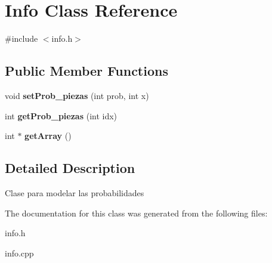 \hypertarget{classInfo}{\section{Info Class Reference}
\label{classInfo}
}


{\ttfamily \#include $<$info.\-h$>$}

\subsection*{Public Member Functions}
\begin{DoxyCompactItemize}
\item 
\hypertarget{classInfo_ad2a426dac2faca7998c6bcd2074baead}{void {\bfseries set\-Prob\-\_\-piezas} (int prob, int x)}\label{classInfo_ad2a426dac2faca7998c6bcd2074baead}

\item 
\hypertarget{classInfo_aa1536bee11bb5d2f9d76e2d44f26c6f5}{int {\bfseries get\-Prob\-\_\-piezas} (int idx)}\label{classInfo_aa1536bee11bb5d2f9d76e2d44f26c6f5}

\item 
\hypertarget{classInfo_a673f62e1f79094f22bf7ef0656ba38f3}{int $\ast$ {\bfseries get\-Array} ()}\label{classInfo_a673f62e1f79094f22bf7ef0656ba38f3}

\end{DoxyCompactItemize}


\subsection{Detailed Description}
Clase para modelar las probabilidades 

The documentation for this class was generated from the following files\-:\begin{DoxyCompactItemize}
\item 
info.\-h\item 
info.\-cpp\end{DoxyCompactItemize}
